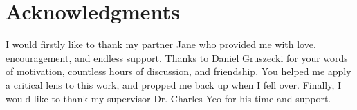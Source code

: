 \chapter*{Acknowledgments}
I would firstly like to thank my partner Jane who provided me with love, encouragement, and endless support. Thanks to Daniel Gruszecki for your words of motivation, countless hours of discussion, and friendship. You helped me apply a critical lens to this work, and propped me back up when I fell over. Finally, I would like to thank my supervisor Dr. Charles Yeo for his time and support.